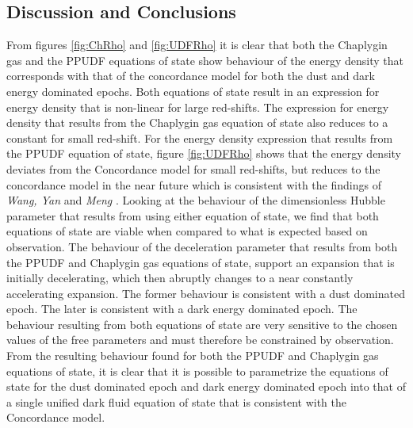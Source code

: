 \documentclass[a0,portrait]{a0poster}
\begin{document}
\begin{multicols}{2}
\section*{Discussion and Conclusions}
From figures \ref{fig:ChRho} and \ref{fig:UDFRho} it is clear that both the Chaplygin gas and the PPUDF equations of state show behaviour of the energy density that corresponds with that of the concordance model for both the dust and dark energy dominated epochs. Both equations of state result in an expression for energy density that is non-linear for large red-shifts. The expression for energy density that results from the Chaplygin gas equation of state also reduces to a constant for small red-shift. For the energy density expression that results from the PPUDF equation of state, figure \ref{fig:UDFRho} shows that the energy density deviates from the Concordance model for small red-shifts, but reduces to the concordance model in the near future which is consistent with the findings of \textit{Wang, Yan} and \textit{Meng} \citep{wang2017new}. Looking at the behaviour of the dimensionless Hubble parameter that results from using either equation of state, we find that both equations of state are viable when compared to what is expected based on observation. The behaviour of the deceleration parameter that results from both the PPUDF and Chaplygin gas equations of state, support an expansion that is initially decelerating, which then abruptly changes to a near constantly accelerating expansion. The former behaviour is consistent with a dust dominated epoch. The later is consistent with a dark energy dominated epoch. The behaviour resulting from both equations of state are very sensitive to the chosen values of the free parameters and must therefore be constrained by observation.\\
From the resulting behaviour found for both the PPUDF and Chaplygin gas equations of state, it is clear that it is possible to parametrize the equations of state for the dust dominated epoch and dark energy dominated epoch into that of a single unified dark fluid equation of state that is consistent with the Concordance model.



\color{DarkSlateGray} %





\end{multicols}
\end{document}
